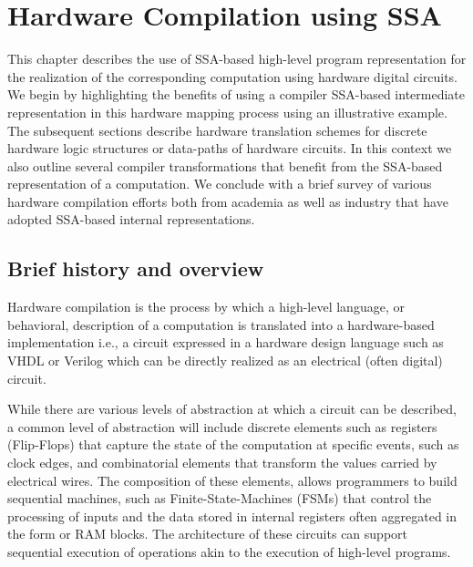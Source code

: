 \chapter{Hardware Compilation using SSA
}
\label{chapter:hardware_compilation}

This chapter describes the use of SSA-based high-level program representation for the realization of the corresponding computation using hardware digital circuits. 
  We begin by highlighting the benefits of using a compiler SSA-based intermediate representation in this hardware mapping process using an illustrative example. 
  The subsequent sections describe hardware translation schemes for discrete hardware logic structures or data-paths of hardware circuits. 
  In this context we also outline several compiler transformations that benefit from the SSA-based representation of a computation. 
  We conclude with a brief survey of various hardware compilation efforts both from academia as well as industry that have adopted SSA-based internal representations.


\renewcommand{\comment}[1]{}

\section{Brief history and overview}

Hardware compilation is the process by which a high-level language, or behavioral, description of a computation is translated into a hardware-based implementation i.e., a circuit expressed in a hardware design language such as VHDL or Verilog which can be directly realized as an electrical (often digital) circuit. 

While there are various levels of abstraction at which a circuit can be described, a common level of abstraction will include discrete elements such as registers (Flip-Flops) that capture the state of the computation at specific events, such as clock edges, and combinatorial elements that transform the values carried by electrical wires. The composition of these elements, allows programmers to build sequential machines, such as Finite-State-Machines (FSMs) that control the processing of inputs and the data stored in internal registers often aggregated in the form or RAM blocks. The architecture of these circuits can support sequential execution of operations akin to the execution of high-level programs.

